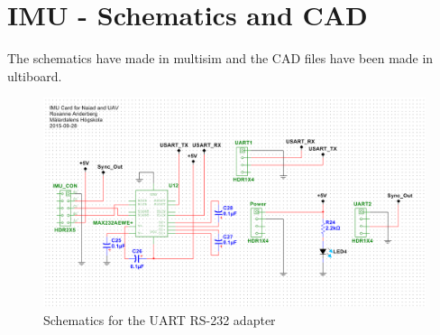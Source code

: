 


\section{IMU - Schematics and CAD} \label{App:IMUSchematicsAndCAD}
The schematics have made in multisim and the CAD files have been made in ultiboard.


\begin{figure}[!htbp]
    \centering
        \includegraphics[width = \columnwidth]{IMUschematics}
        \caption{Schematics for the UART RS-232 adapter} \label{schematics}
\end{figure}


